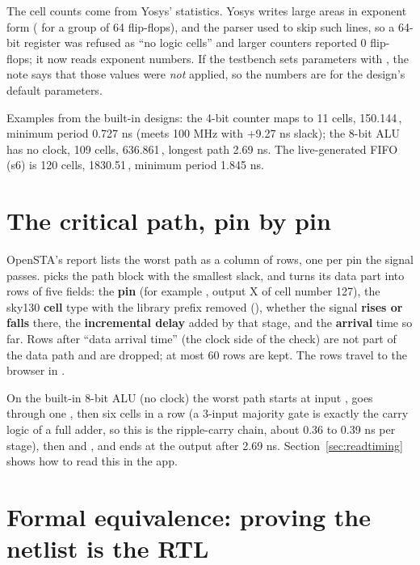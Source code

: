 The cell counts come from Yosys' statistics. Yosys writes large areas in exponent form ( for a group of 64 flip-flops), and the parser used to skip such lines, so a 64-bit register was refused as ``no logic cells'' and larger counters reported 0 flip-flops; it now reads exponent numbers. If the testbench sets parameters with , the note says that those values were \emph{not} applied, so the numbers are for the design's default parameters.

Examples from the built-in designs: the 4-bit counter maps to 11 cells, 150.144\,\umsq{}, minimum period 0.727 ns (meets 100 MHz with +9.27 ns slack); the 8-bit ALU has no clock, 109 cells, 636.861\,\umsq{}, longest path 2.69 ns. The live-generated FIFO (s6) is 120 cells, 1830.51\,\umsq{}, minimum period 1.845 ns.

\section{The critical path, pin by pin}
\label{sec:critpath}

OpenSTA's report lists the worst path as a column of rows, one per pin the signal passes.  picks the path block with the smallest slack, and  turns its data part into rows of five fields: the \textbf{pin} (for example , output X of cell number 127), the sky130 \textbf{cell} type with the library prefix removed (), whether the signal \textbf{rises or falls} there, the \textbf{incremental delay} added by that stage, and the \textbf{arrival} time so far. Rows after ``data arrival time'' (the clock side of the check) are not part of the data path and are dropped; at most 60 rows are kept. The rows travel to the browser in .

On the built-in 8-bit ALU (no clock) the worst path starts at input , goes through one , then six  cells in a row (a 3-input majority gate is exactly the carry logic of a full adder, so this is the ripple-carry chain, about 0.36 to 0.39 ns per stage), then  and , and ends at the output  after 2.69 ns. Section~\ref{sec:readtiming} shows how to read this in the app.

\section{Formal equivalence: proving the netlist is the RTL}
\label{sec:equivalence}

